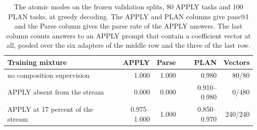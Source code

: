 \begin{table}[!tbh]
\centering\scriptsize\setlength{\tabcolsep}{4pt}
\begin{tabular}{|p{.30\linewidth}|r|r|r|r|}
\hline
\textbf{Training mixture} & \textbf{APPLY} & \textbf{Parse} & \textbf{PLAN} & \textbf{Vectors} \\
\hline
no composition supervision & 1.000 & 1.000 & 0.980 & 80/80 \\ \hline
APPLY absent from the stream & 0.000 & 0.000 & 0.910--0.980 & 0/480 \\ \hline
APPLY at 17 percent of the stream & 0.975--1.000 & 1.000 & 0.850--0.970 & 240/240 \\ \hline
\end{tabular}
\caption{The atomic modes on the frozen validation splits, 80 APPLY tasks and 100
PLAN tasks, at greedy decoding. The APPLY and PLAN columns give pass@1 and the
Parse column gives the parse rate of the APPLY answers. The last column counts
answers to an APPLY prompt that contain a coefficient vector at all, pooled over
the six adapters of the middle row and the three of the last row.}
\label{tab:retention}
\end{table}
